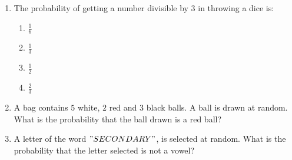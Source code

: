 \documentclass{article}
\begin{document}
 \begin{enumerate}
         \item The probability of getting a number divisible by $3$ in throwing a dice is:
		 \begin{enumerate}
		 \item $\frac{1}{6}$
		 \item $\frac{1}{3}$
		 \item $\frac{1}{2}$
		 \item $\frac{2}{3}$
		 \end{enumerate}
	 \item A bag contains $5$ white, $2$ red and $3$ black balls. A ball is drawn at random. What is the probability that the ball drawn is a red ball?
	 \item A letter of the word $"SECONDARY"$, is selected at random. What is the probability that the letter selected is not a vowel?
 \end{enumerate}
 
\end{document}
